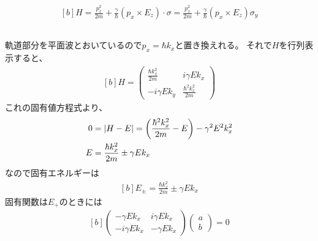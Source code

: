 \documentclass[../ap_2014.tex]{subfiles}
\begin{document}
\section{}
\subsection{}
\begin{equation}\begin{aligned}[b]
    H = \frac{p_x^2}{2m}+\frac{\gamma}{\hbar}(p_x\times E_z)\cdot \sigma
    = \frac{p_x^2}{2m}+\frac{\gamma}{\hbar}(p_x\times E_z)\sigma_y
\end{aligned}\end{equation}

\subsection{}
軌道部分を平面波とおいているので\(p_x = \hbar k_x\)と置き換えれる。
それで\(H\)を行列表示すると、
\begin{equation}\begin{aligned}[b]
    H = \begin{pmatrix}
        \frac{\hbar k_x^2}{2m} & i\gamma Ek_x\\
        -i\gamma Ek_y & \frac{\hbar^2k_x^2}{2m}
    \end{pmatrix}
\end{aligned}\end{equation}
これの固有値方程式より、
\begin{equation}\begin{aligned}[b]
    0 &= \abs{H-E}=\qty(\frac{\hbar^2k_x^2}{2m}-E)-\gamma^2 E^2k_x^2\\
    E &= \frac{\hbar k_x^2}{2m}\pm \gamma Ek_x
\end{aligned}\end{equation}
なので固有エネルギーは
\begin{equation}\begin{aligned}[b]
    E_\pm =\frac{\hbar k_x^2}{2m}\pm \gamma Ek_x
\end{aligned}\end{equation}
固有関数は\(E_+\)のときには
\begin{equation}\begin{aligned}[b]
    \begin{pmatrix}
        -\gamma Ek_x & i\gamma Ek_x\\
        -i\gamma Ek_x & -\gamma Ek_x
    \end{pmatrix}\begin{pmatrix}
        a \\ b
    \end{pmatrix}=0
\end{aligned}\end{equation}
\end{document}
